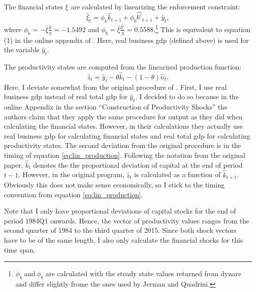 The financial states \( \xi \) are calculated by linearizing the enforcement
constraint:
\begin{equation}
\label{eq:fin_shock_correct_timing}
    \hat{\xi}_t = \phi_k \hat{k}_{t+1} + \phi_b \hat{b^e}_{t+1} + \hat{y}_t,
\end{equation}
where \(\phi_k = - \bar{\xi} \frac{\bar{k}}{\bar{y}} = -1.5492\) and
\(\phi_b = \bar{\xi} \frac{\bar{b^e}}{\bar{y}} =
0.5588\).\footnote{\(\phi_k~\text{and}~\phi_b\) are calculated with the steady
  state values returned from dynare and differ slightly frome the ones used by
  Jerman and Quadrini.}  This is equivalent to equation (1) in the online
appendix of \textcite{jerman_macroeconomic_2012}. Here, real business gdp
(defined above) is used for the variable \(\hat{y}_t\).

The productivity states are computed from the linearized production function:
\begin{equation}
\label{eq:lin_production}
    \hat{z}_t = \hat{y}_t - \theta \hat{k}_t - (1 - \theta) \hat{n}_t.
\end{equation}
Here, I deviate somewhat from the original procedure of
\citeauthor{jerman_macroeconomic_2012}. First, I use real business gdp instead
of real total gdp for \(\hat{y}_t\). I decided to do so because in the online
Appendix in the section ``Construction of Productivity Shocks'' the authors
claim that they apply the same procedure for output as they did when
calculating the financial states. However, in their calculations they actually
use real business gdp for calculating financial states and real total gdp for
calculating productivity states. The second deviation from the original
procedure is in the timing of equation \ref{eq:lin_production}. Following the
notation from the original paper, \(\hat{k}_t\) denotes the the proportional
deviation of capital at the end of period \(t - 1\). However, in the original
program, \(\hat{z}_t\) is calculated as a function of \(\hat{k}_{t +
  1}\). Obviously this does not make sense economically, so I stick to the
timing convention from equation \ref{eq:lin_production}.

Note that I only have proportional deviations of capital stocks for the end of
period 1984Q1 onwards. Hence, the vector of productivity values ranges from the
second quarter of 1984 to the third quarter of 2015. Since both shock
vectors have to be of the same length, I also only calculate the financial
shocks for this time span.



